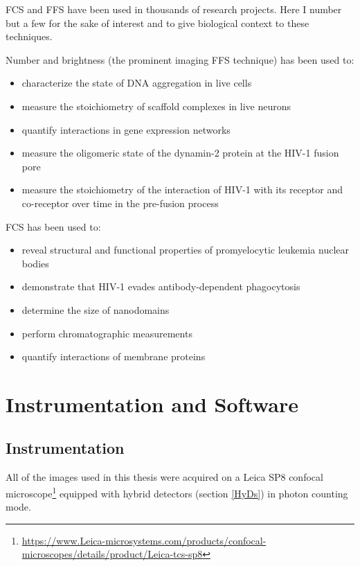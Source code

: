 \documentclass[12pt,]{book}
\providecommand{\tightlist}{%
  \setlength{\itemsep}{0pt}\setlength{\parskip}{0pt}}
\let\rmarkdownfootnote\footnote%
\def\footnote{\protect\rmarkdownfootnote}
\theoremstyle{definition}
\theoremstyle{definition}
\theoremstyle{definition}
\theoremstyle{remark}
\begin{document}
FCS and FFS have been used in thousands of research projects. Here I
number but a few for the sake of interest and to give biological context
to these techniques.

Number and brightness (the prominent imaging FFS technique) has been
used to:

\begin{itemize}
\tightlist
\item
  characterize the state of DNA aggregation in live cells
  \citep{Mieruszynski}
\item
  measure the stoichiometry of scaffold complexes in live neurons
  \citep{Moutin}
\item
  quantify interactions in gene expression networks \citep{Declerck}
\item
  measure the oligomeric state of the dynamin-2 protein at the HIV-1
  fusion pore \citep{DanDynamin}
\item
  measure the stoichiometry of the interaction of HIV-1 with its
  receptor and co-receptor over time in the pre-fusion process
  \citep{HIVstoichiometry}
\end{itemize}

FCS has been used to:

\begin{itemize}
\tightlist
\item
  reveal structural and functional properties of promyelocytic leukemia
  nuclear bodies \citep{Hoischen}
\item
  demonstrate that HIV-1 evades antibody-dependent phagocytosis
  \citep{Gach}
\item
  determine the size of nanodomains \citep{Fenz}
\item
  perform chromatographic measurements \citep{Kisley}
\item
  quantify interactions of membrane proteins \citep{Ly}
\end{itemize}

\chapter{Instrumentation and
Software}\label{instrumentation-and-software}

\section{Instrumentation}\label{instrumentation}

All of the images used in this thesis were acquired on a Leica SP8
confocal microscope\footnote{\url{https://www.Leica-microsystems.com/products/confocal-microscopes/details/product/Leica-tcs-sp8}}
equipped with hybrid detectors (section \ref{HyDs}) in photon counting
mode.
\end{document}
